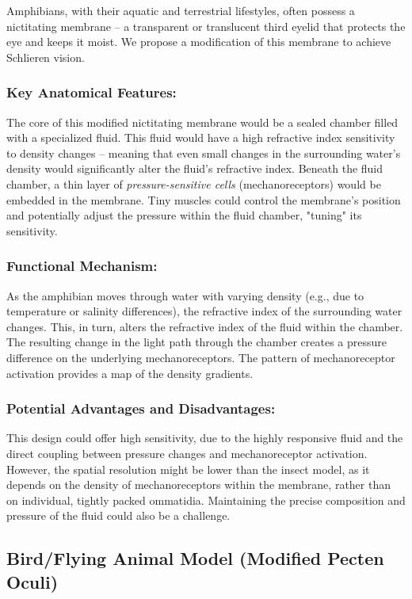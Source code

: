 \documentclass[11pt]{article}
\begin{document}
Amphibians, with their aquatic and terrestrial lifestyles, often possess a nictitating membrane – a transparent or translucent third eyelid that protects the eye and keeps it moist. We propose a modification of this membrane to achieve Schlieren vision.

\subsubsection{Key Anatomical Features:}
The core of this modified nictitating membrane would be a sealed chamber filled with a specialized fluid. This fluid would have a high refractive index sensitivity to density changes – meaning that even small changes in the surrounding water's density would significantly alter the fluid's refractive index. Beneath the fluid chamber, a thin layer of \textit{pressure-sensitive cells} (mechanoreceptors) would be embedded in the membrane. Tiny muscles could control the membrane's position and potentially adjust the pressure within the fluid chamber, "tuning" its sensitivity.

\subsubsection{Functional Mechanism:}
As the amphibian moves through water with varying density (e.g., due to temperature or salinity differences), the refractive index of the surrounding water changes. This, in turn, alters the refractive index of the fluid within the chamber. The resulting change in the light path through the chamber creates a pressure difference on the underlying mechanoreceptors. The pattern of mechanoreceptor activation provides a map of the density gradients.

\subsubsection{Potential Advantages and Disadvantages:}
This design could offer high sensitivity, due to the highly responsive fluid and the direct coupling between pressure changes and mechanoreceptor activation. However, the spatial resolution might be lower than the insect model, as it depends on the density of mechanoreceptors within the membrane, rather than on individual, tightly packed ommatidia. Maintaining the precise composition and pressure of the fluid could also be a challenge.

\subsection{Bird/Flying Animal Model (Modified Pecten Oculi)}
\end{document}
